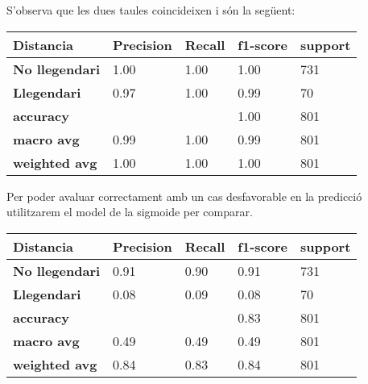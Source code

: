 \documentclass[a4paper, 11pt]{article}
\begin{document}
        S'observa que les dues taules coincideixen i són la següent:
        \begin{table}[H]
            \centering
            \begin{tabular}{|l|l|l|l|l|}
            \hline
            \textbf{Distancia}     & \textbf{Precision} & \textbf{Recall} & \textbf{f1-score} & \textbf{support} \\ \hline
            \textbf{No llegendari} & 1.00               & 1.00            & 1.00              & 731              \\ \hline
            \textbf{Llegendari}    & 0.97               & 1.00            & 0.99              & 70               \\ \hline
            \textbf{accuracy}      &                    &                 & 1.00              & 801              \\ \hline
            \textbf{macro avg}     & 0.99               & 1.00            & 0.99              & 801              \\ \hline
            \textbf{weighted avg}  & 1.00               & 1.00            & 1.00              & 801              \\ \hline
            \end{tabular}
        \end{table}

        Per poder avaluar correctament amb un cas desfavorable en la predicció utilitzarem el model de la sigmoide per comparar.

        \begin{table}[H]
            \centering
            \begin{tabular}{|l|l|l|l|l|}
            \hline
            \textbf{Distancia}     & \textbf{Precision} & \textbf{Recall} & \textbf{f1-score} & \textbf{support} \\ \hline
            \textbf{No llegendari} & 0.91               & 0.90            & 0.91              & 731              \\ \hline
            \textbf{Llegendari}    & 0.08               & 0.09            & 0.08              & 70               \\ \hline
            \textbf{accuracy}      &                    &                 & 0.83              & 801              \\ \hline
            \textbf{macro avg}     & 0.49               & 0.49            & 0.49              & 801              \\ \hline
            \textbf{weighted avg}  & 0.84               & 0.83            & 0.84              & 801              \\ \hline
            \end{tabular}
        \end{table}
\end{document}
